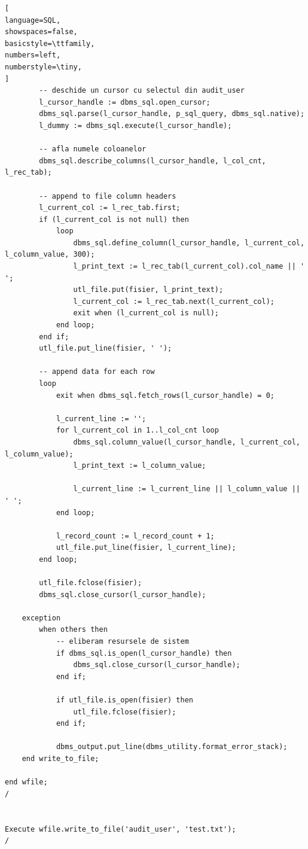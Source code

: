 \documentclass[12pt]{article}
\begin{document}
\begin{lstlisting}[
language=SQL,
showspaces=false,
basicstyle=\ttfamily,
numbers=left,
numberstyle=\tiny,
]
        -- deschide un cursor cu selectul din audit_user
        l_cursor_handle := dbms_sql.open_cursor;
        dbms_sql.parse(l_cursor_handle, p_sql_query, dbms_sql.native);
        l_dummy := dbms_sql.execute(l_cursor_handle);
        
        -- afla numele coloanelor
        dbms_sql.describe_columns(l_cursor_handle, l_col_cnt, l_rec_tab);
        
        -- append to file column headers
        l_current_col := l_rec_tab.first;
        if (l_current_col is not null) then
            loop
                dbms_sql.define_column(l_cursor_handle, l_current_col, l_column_value, 300);
                l_print_text := l_rec_tab(l_current_col).col_name || ' ';
                utl_file.put(fisier, l_print_text);
                l_current_col := l_rec_tab.next(l_current_col);
                exit when (l_current_col is null);
            end loop;
        end if;
        utl_file.put_line(fisier, ' ');
        
        -- append data for each row
        loop
            exit when dbms_sql.fetch_rows(l_cursor_handle) = 0;
            
            l_current_line := '';
            for l_current_col in 1..l_col_cnt loop
                dbms_sql.column_value(l_cursor_handle, l_current_col, l_column_value);
                l_print_text := l_column_value;
                
                l_current_line := l_current_line || l_column_value || ' ';
            end loop;
            
            l_record_count := l_record_count + 1;
            utl_file.put_line(fisier, l_current_line);
        end loop;
        
        utl_file.fclose(fisier);
        dbms_sql.close_cursor(l_cursor_handle);
        
    exception
        when others then
            -- eliberam resursele de sistem
            if dbms_sql.is_open(l_cursor_handle) then
                dbms_sql.close_cursor(l_cursor_handle);
            end if;
            
            if utl_file.is_open(fisier) then
                utl_file.fclose(fisier);
            end if;
            
            dbms_output.put_line(dbms_utility.format_error_stack);
    end write_to_file;
    
end wfile;
/


Execute wfile.write_to_file('audit_user', 'test.txt');
/
\end{lstlisting}
\end{document}
